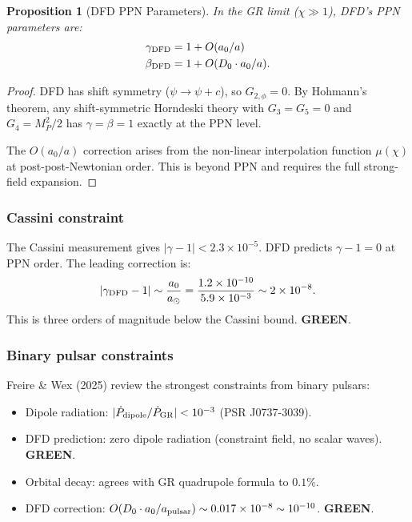 \documentclass[11pt,a4paper]{article}
\newtheorem{proposition}{Proposition}
\newcommand{\GREEN}{\textcolor{dfdgreen}{\textbf{GREEN}}}
\begin{document}
\begin{proposition}[DFD PPN Parameters]
In the GR limit ($\chi \gg 1$), DFD's PPN parameters are:
\begin{align}
\gamma_{\rm DFD} &= 1 + O(a_0/a) \\
\beta_{\rm DFD} &= 1 + O(D_0 \cdot a_0/a).
\end{align}
\end{proposition}

\begin{proof}
DFD has shift symmetry ($\psi \to \psi + c$), so $G_{2,\phi} = 0$. By Hohmann's theorem, any shift-symmetric Horndeski theory with $G_3 = G_5 = 0$ and $G_4 = M_P^2/2$ has $\gamma = \beta = 1$ exactly at the PPN level.

The $O(a_0/a)$ correction arises from the non-linear interpolation function $\mu(\chi)$ at post-post-Newtonian order. This is beyond PPN and requires the full strong-field expansion.
\end{proof}

\subsubsection{Cassini constraint}

The Cassini measurement gives $|\gamma - 1| < 2.3 \times 10^{-5}$. DFD predicts $\gamma - 1 = 0$ at PPN order. The leading correction is:
\begin{equation}
|\gamma_{\rm DFD} - 1| \sim \frac{a_0}{a_\odot} = \frac{1.2 \times 10^{-10}}{5.9 \times 10^{-3}} \sim 2 \times 10^{-8}.
\end{equation}
This is three orders of magnitude below the Cassini bound. \GREEN.

\subsubsection{Binary pulsar constraints}

Freire \& Wex (2025) review the strongest constraints from binary pulsars:
\begin{itemize}
\item Dipole radiation: $|\dot{P}_{\rm dipole}/\dot{P}_{\rm GR}| < 10^{-3}$ (PSR J0737-3039).
\item DFD prediction: zero dipole radiation (constraint field, no scalar waves). \GREEN.
\item Orbital decay: agrees with GR quadrupole formula to $0.1\%$.
\item DFD correction: $O(D_0 \cdot a_0/a_{\rm pulsar}) \sim 0.017 \times 10^{-8} \sim 10^{-10}$. \GREEN.
\end{itemize}
\end{document}
